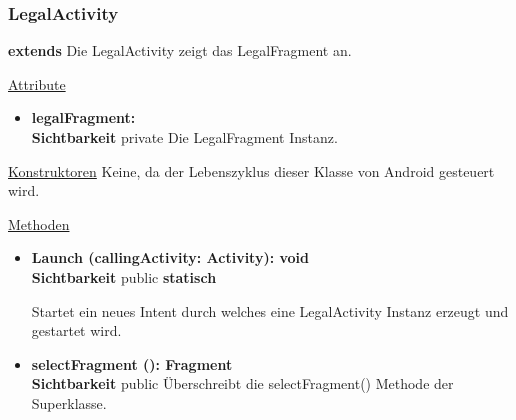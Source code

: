 \subsubsection{LegalActivity} \label{app:klasse:LegalActivity}
\textbf{extends}  \newline
Die LegalActivity zeigt das LegalFragment an.
\newline

\underline{Attribute}
\begin{itemize}
\itemsep0pt
\item \textbf{legalFragment: } \hfill\\ 
\textbf{Sichtbarkeit} private\newline
Die LegalFragment Instanz.

\end{itemize}

\underline{Konstruktoren}\newline
\indent Keine, da der Lebenszyklus dieser Klasse von Android gesteuert wird.\newline

\underline{Methoden}
\begin{itemize}
\itemsep0pt

\item \textbf{Launch (callingActivity: Activity): void}\hfill\\
\textbf{Sichtbarkeit} public \newline
\textbf{statisch} 

Startet ein neues Intent durch welches eine LegalActivity Instanz erzeugt und gestartet wird.

\item \textbf{selectFragment (): Fragment}\hfill\\
\textbf{Sichtbarkeit} public\newline
Überschreibt die selectFragment() Methode der Superklasse.

\end{itemize}